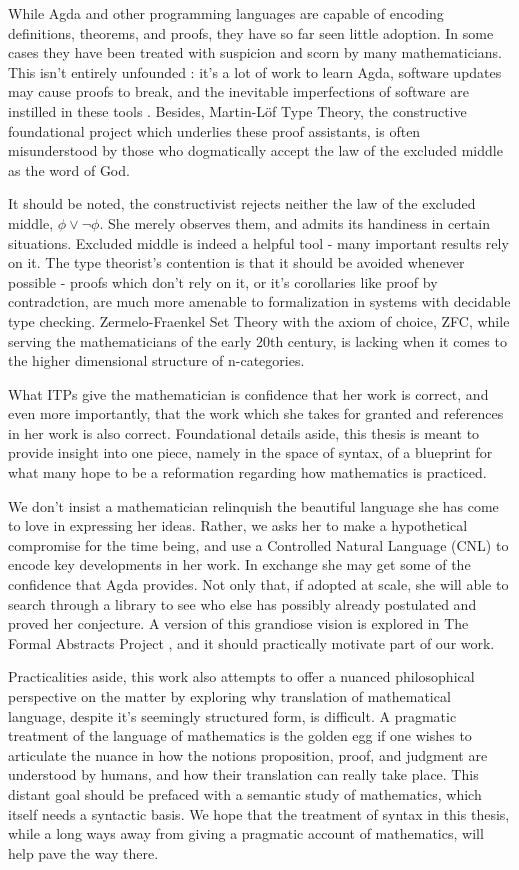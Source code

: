 While Agda and other programming languages are capable of encoding definitions,
theorems, and proofs, they have so far seen little adoption. In some cases they
have been treated with suspicion and scorn by many mathematicians. This isn't
entirely unfounded : it's a lot of work to learn Agda,
software updates may cause proofs to break, and the inevitable imperfections of
software are instilled in these tools . Besides, Martin-Löf Type Theory,
the constructive foundational project which underlies these proof assistants, is
often misunderstood by those who dogmatically accept the law of the excluded
middle as the word of God.

It should be noted, the constructivist rejects neither the law of the excluded
middle, $\phi \lor \neg \phi$. She merely observes them, and admits its handiness
in certain situations. Excluded middle is indeed a helpful tool - many important
results rely on it. The type theorist's contention is that it should be avoided
whenever possible - proofs which don't rely on it, or it's corollaries like
proof by contradction, are much more amenable to formalization in systems with
decidable type checking. Zermelo-Fraenkel Set Theory with the axiom of choice,
ZFC, while serving the mathematicians of the early 20th century, is lacking when
it comes to the higher dimensional structure of n-categories.

What ITPs give the mathematician is confidence that her work is correct, and
even more importantly, that the work which she takes for granted and references
in her work is also correct. Foundational details aside, this thesis is meant to
provide insight into one piece, namely in the space of syntax, of a blueprint
for what many hope to be a reformation regarding how mathematics is practiced.

We don't insist a mathematician relinquish the beautiful language she has come
to love in expressing her ideas. Rather, we asks her to make a hypothetical
compromise for the time being, and use a Controlled Natural Language (CNL) to
encode key developments in her work. In exchange she may get some of the
confidence that Agda provides. Not only that, if adopted at scale, she will able
to search through a library to see who else has possibly already postulated and
proved her conjecture. A version of this grandiose vision is explored in The
Formal Abstracts Project \cite{halesCNL}, and it should practically motivate
part of our work.

Practicalities aside, this work also attempts to offer a nuanced philosophical
perspective on the matter by exploring why translation of mathematical language,
despite it's seemingly structured form, is difficult. A pragmatic treatment of
the language of mathematics is the golden egg if one wishes to articulate the
nuance in how the notions proposition, proof, and judgment are understood by
humans, and how their translation can really take place. This distant goal
should be prefaced with a semantic study of mathematics, which itself needs a
syntactic basis. We hope that the treatment of syntax in this thesis, while a
long ways away from giving a pragmatic account of mathematics, will help pave
the way there.

